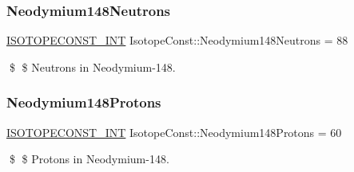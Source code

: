 \subsubsection{\texorpdfstring{Neodymium148\+Neutrons}{Neodymium148Neutrons}}
{\footnotesize\ttfamily \mbox{\hyperlink{group___isotope_const-_macros_ga5f18360b3e99483a35c32d789e62621c}{I\+S\+O\+T\+O\+P\+E\+C\+O\+N\+S\+T\+\_\+\+I\+NT}} Isotope\+Const\+::\+Neodymium148\+Neutrons = 88}

\$ \$ Neutrons in Neodymium-\/148. \mbox{\label{group___isotope_const-_neodymium-_nd148_ga867cd365c1bbd8d660aeb485c409eb47}} 
\subsubsection{\texorpdfstring{Neodymium148\+Protons}{Neodymium148Protons}}
{\footnotesize\ttfamily \mbox{\hyperlink{group___isotope_const-_macros_ga5f18360b3e99483a35c32d789e62621c}{I\+S\+O\+T\+O\+P\+E\+C\+O\+N\+S\+T\+\_\+\+I\+NT}} Isotope\+Const\+::\+Neodymium148\+Protons = 60}

\$ \$ Protons in Neodymium-\/148. 